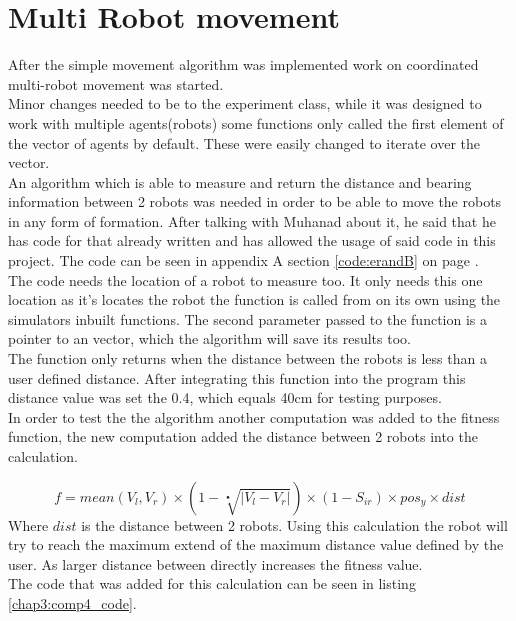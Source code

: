 \section{Multi Robot movement}
After the simple movement algorithm was implemented work on coordinated multi-robot movement was started.\\
Minor changes needed to be to the experiment class, while it was designed to work with multiple agents(robots) some functions only called the first element of the vector of agents by default. These were easily changed to iterate over the vector. \\

An algorithm which is able to measure and return the distance and bearing information between 2 robots was needed in order to be able to move the robots in any form of formation. After talking with Muhanad about it, he said that he has code for that already written and has allowed the usage of said code in this project. The code can be seen in appendix A section \ref{code:erandB} on page \pageref{code:erandB}.\\
The code needs the location of a robot to measure too. It only needs this one location as it's locates the robot the function is called from on its own using the simulators inbuilt functions.  The second parameter passed to the function is a pointer to an vector, which the algorithm will save its results too. \\
The function only returns when the distance between the robots is less than a user defined distance. After integrating this function into the program this distance value was set the 0.4, which equals 40cm for testing purposes. \\

In order to test the the algorithm another computation was added to the fitness function, the new computation added the distance between 2 robots into the calculation.

\begin{equation}
f = mean(V_l, V_r) \times ( 1 - \sqrt[•]{|V_l - V_r|}) \times (1 - S_{ir}) \times pos_y \times dist
\end{equation}
Where $dist$ is the distance between 2 robots. Using this calculation the robot will try to reach the maximum extend of the maximum distance value defined by the user.
As larger distance between directly increases the fitness value. \\
The code that was added for this calculation can be seen in listing \ref{chap3:comp4_code}.

